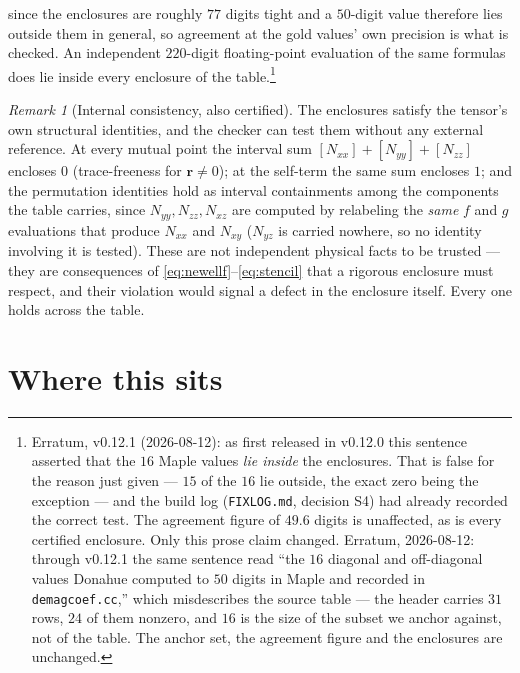 \documentclass[11pt]{amsart}
\theoremstyle{plain}
\theoremstyle{definition}
\theoremstyle{remark}
\newtheorem{remark}[theorem]{Remark}
\begin{document}
since the enclosures are roughly $77$ digits tight and a $50$-digit value
therefore lies outside them in general, so agreement at the gold values' own
precision is what is checked. An independent
$220$-digit floating-point evaluation of the same formulas does lie inside every
enclosure of the table.\footnote{Erratum, v0.12.1 (2026-08-12): as first
released in v0.12.0 this sentence asserted that the $16$ Maple values
\emph{lie inside} the enclosures. That is false for the reason just given —
$15$ of the $16$ lie outside, the exact zero being the exception — and the
build log (\texttt{FIXLOG.md}, decision S4) had already recorded the correct
test. The agreement figure of $49.6$ digits is unaffected, as is every
certified enclosure. Only this prose claim changed. Erratum, 2026-08-12: through v0.12.1 the same sentence read ``the $16$ diagonal and
off-diagonal values Donahue computed to $50$ digits in Maple and recorded in
\texttt{demagcoef.cc},'' which misdescribes the source table --- the header
carries $31$ rows, $24$ of them nonzero, and $16$ is the size of the subset we
anchor against, not of the table. The anchor set, the agreement figure and the
enclosures are unchanged.}

\begin{remark}[Internal consistency, also certified]\label{rem:consistency}
The enclosures satisfy the tensor's own structural identities, and the checker
can test them without any external reference. At every mutual point the interval
sum $[N_{xx}]+[N_{yy}]+[N_{zz}]$ encloses $0$ (trace-freeness for
$\mathbf r\neq0$); at the self-term the same sum encloses $1$; and the
permutation identities hold as interval containments among the components the
table carries, since $N_{yy},N_{zz},N_{xz}$ are computed by relabeling the
\emph{same} $f$ and $g$ evaluations that produce $N_{xx}$ and $N_{xy}$
($N_{yz}$ is carried nowhere, so no identity involving it is tested). These are not
independent physical facts to be trusted --- they are consequences of
\eqref{eq:newellf}--\eqref{eq:stencil} that a rigorous enclosure must respect, and
their violation would signal a defect in the enclosure itself. Every one holds
across the table.
\end{remark}

\section{Where this sits}
\end{document}
